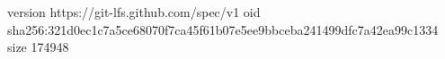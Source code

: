 version https://git-lfs.github.com/spec/v1
oid sha256:321d0ec1c7a5ce68070f7ca45f61b07e5ee9bbceba241499dfc7a42ea99c1334
size 174948
